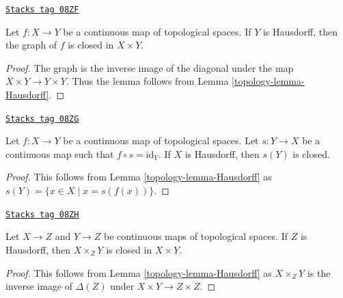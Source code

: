 \begin{lemma}
\label{topology-lemma-graph-closed}
\href{https://stacks.math.columbia.edu/tag/08ZF}{\texttt{Stacks tag 08ZF}}


Let $f : X \to Y$ be a continuous map of topological spaces.
If $Y$ is Hausdorff, then the graph of $f$ is closed in $X \times Y$.
\end{lemma}

\begin{proof}

The graph is the inverse image of the diagonal under the map
$X \times Y \to Y \times Y$. Thus the lemma follows from
Lemma \ref{topology-lemma-Hausdorff}.
\end{proof}

\begin{lemma}
\label{topology-lemma-section-closed}
\href{https://stacks.math.columbia.edu/tag/08ZG}{\texttt{Stacks tag 08ZG}}

Let $f : X \to Y$ be a continuous map of topological spaces.
Let $s : Y \to X$ be a continuous map such that $f \circ s = \text{id}_Y$.
If $X$ is Hausdorff, then $s(Y)$ is closed.
\end{lemma}

\begin{proof}

This follows from Lemma \ref{topology-lemma-Hausdorff} as
$s(Y) = \{x \in X \mid x = s(f(x))\}$.
\end{proof}

\begin{lemma}
\label{topology-lemma-fibre-product-closed}
\href{https://stacks.math.columbia.edu/tag/08ZH}{\texttt{Stacks tag 08ZH}}

Let $X \to Z$ and $Y \to Z$ be continuous maps of topological spaces.
If $Z$ is Hausdorff, then $X \times_Z Y$ is closed in $X \times Y$.
\end{lemma}

\begin{proof}

This follows from Lemma \ref{topology-lemma-Hausdorff} as
$X \times_Z Y$ is the inverse image of $\Delta(Z)$
under $X \times Y \to Z \times Z$.
\end{proof}

